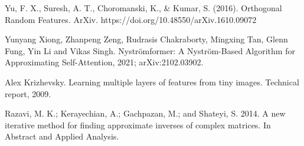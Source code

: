 \begin{thebibliography}{unsrt}
Yu, F. X., Suresh, A. T., Choromanski, K., & Kumar, S. (2016). Orthogonal Random Features. ArXiv. https://doi.org/10.48550/arXiv.1610.09072

Yunyang Xiong, Zhanpeng Zeng, Rudrasis Chakraborty, Mingxing Tan, Glenn Fung, Yin Li and Vikas Singh.
\newblock Nyströmformer: A Nyström-Based Algorithm for Approximating Self-Attention, 2021;
\newblock arXiv:2102.03902.

Alex Krizhevsky. Learning multiple layers of features from tiny images. Technical report, 2009.

Razavi, M. K.; Kerayechian, A.; Gachpazan, M.; and Shateyi, S.
2014. A new iterative method for finding approximate inverses of
complex matrices. In Abstract and Applied Analysis.

\end{thebibliography}



